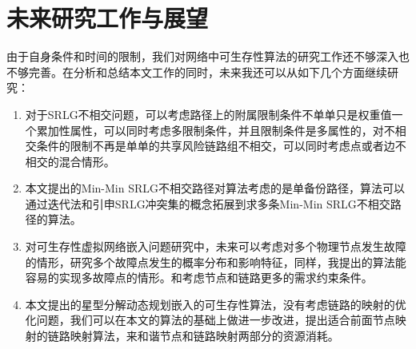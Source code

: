 \section{未来研究工作与展望}
由于自身条件和时间的限制，我们对网络中可生存性算法的研究工作还不够深入也不够完善。在分析和总结本文工作的同时，未来我还可以从如下几个方面继续研究：
\begin{enumerate}
  \item 对于SRLG不相交问题，可以考虑路径上的附属限制条件不单单只是权重值一个累加性属性，可以同时考虑多限制条件，并且限制条件是多属性的，对不相交条件的限制不再是单单的共享风险链路组不相交，可以同时考虑点或者边不相交的混合情形。
  \item 本文提出的Min-Min SRLG不相交路径对算法考虑的是单备份路径，算法可以通过迭代法和引申SRLG冲突集的概念拓展到求多条Min-Min SRLG不相交路径的算法。
  \item 对可生存性虚拟网络嵌入问题研究中，未来可以考虑对多个物理节点发生故障的情形，研究多个故障点发生的概率分布和影响特征，同样，我提出的算法能容易的实现多故障点的情形。和考虑节点和链路更多的需求约束条件。
  \item 本文提出的星型分解动态规划嵌入的可生存性算法，没有考虑链路的映射的优化问题，我们可以在本文的算法的基础上做进一步改进，提出适合前面节点映射的链路映射算法，来和谐节点和链路映射两部分的资源消耗。
\end{enumerate}


